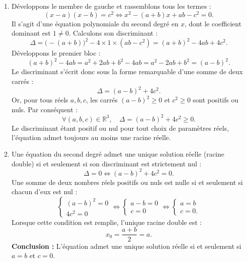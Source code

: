 \documentclass[11pt,a4paper]{article}
\newcommand{\R}{\mathbb{R}}
\begin{document}
\begin{correctionbox}
\begin{enumerate}
    \item Développons le membre de gauche et rassemblons tous les termes :
    \[
    (x-a)(x-b) = c^2 \iff x^2 - (a+b)x + ab - c^2 = 0.
    \]
    Il s'agit d'une équation polynomiale du second degré en $x$, dont le coefficient dominant est $1 \neq 0$.
    Calculons son discriminant :
    \[
    \Delta = \bigl(-(a+b)\bigr)^2 - 4 \times 1 \times (ab - c^2) = (a+b)^2 - 4ab + 4c^2.
    \]
    Développons le premier bloc :
    \[
    (a+b)^2 - 4ab = a^2 + 2ab + b^2 - 4ab = a^2 - 2ab + b^2 = (a-b)^2.
    \]
    Le discriminant s'écrit donc sous la forme remarquable d'une somme de deux carrés :
    \[
    \Delta = (a-b)^2 + 4c^2.
    \]
    Or, pour tous réels $a, b, c$, les carrés $(a-b)^2 \ge 0$ et $c^2 \ge 0$ sont positifs ou nuls.
    Par conséquent :
    \[
    \forall (a, b, c) \in \R^3, \quad \Delta = (a-b)^2 + 4c^2 \ge 0.
    \]
    Le discriminant étant positif ou nul pour tout choix de paramètres réels, l'équation admet toujours au moins une racine réelle.

    \item Une équation du second degré admet une unique solution réelle (racine double) si et seulement si son discriminant est strictement nul :
    \[
    \Delta = 0 \iff (a-b)^2 + 4c^2 = 0.
    \]
    Une somme de deux nombres réels positifs ou nuls est nulle si et seulement si chacun d'eux est nul :
    \[
    \begin{cases}
    (a-b)^2 = 0 \\
    4c^2 = 0
    \end{cases}
    \iff
    \begin{cases}
    a - b = 0 \\
    c = 0
    \end{cases}
    \iff
    \begin{cases}
    a = b \\
    c = 0.
    \end{cases}
    \]
    Lorsque cette condition est remplie, l'unique racine double est :
    \[
    x_0 = \frac{a+b}{2} = a.
    \]
    \textbf{Conclusion :} L'équation admet une unique solution réelle si et seulement si $a = b$ et $c = 0$.
\end{enumerate}
\end{correctionbox}

\end{document}
